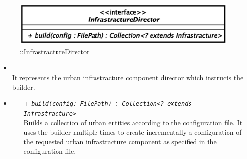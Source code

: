 \begin{figure}[h]
\centering
\includegraphics[scale=0.6,keepaspectratio]{images/solution/app/backend/infrastracture_director.eps}
\caption{\pReactiveBuild::InfrastractureDirector}
\label{fig:sd-app-infrastracture-director}
\end{figure}
\FloatBarrier
\begin{itemize}
  \item \textbf{\descr} \\
    It represents the urban infrastracture component director which instructs the builder.
  \item \textbf{\ops}
  \begin{itemize} 
    \item[+] \texttt{\textit{build(config: FilePath) : Collection<? extends Infrastracture>}} \\
Builds a collection of urban entities according to the configuration file. It uses the
builder multiple times to create incrementally a configuration of the requested
urban infrastracture component as specified in the configuration file.
  \end{itemize}
\end{itemize}
